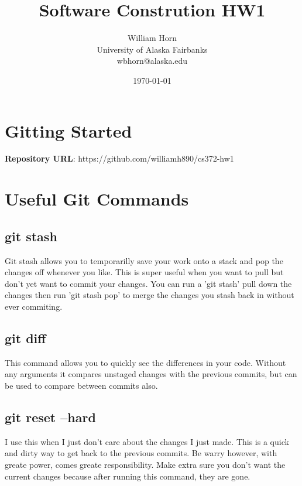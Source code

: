 \documentclass{article}
\begin{document}
\title{Software Constrution HW1}
\author{William Horn\\University of Alaska Fairbanks\\wbhorn@alaska.edu}
\date{\today}
\maketitle
\section{Gitting Started}
\textbf{Repository URL}: https://github.com/williamh890/cs372-hw1 \\
\section{Useful Git Commands}
\subsection{git stash}
Git stash allows you to temporarilly save your work onto a stack and pop the changes off whenever you like.
This is super useful when you want to pull but don't yet want to commit your changes. You can run a 'git stash' pull
down the changes then run 'git stash pop' to merge the changes you stash back in without ever commiting.
\subsection{git diff}
This command allows you to quickly see the differences in your code. Without any arguments it compares unstaged changes
with the previous commits, but can be used to compare between commits also.
\subsection{git reset --hard}
I use this when I just don't care about the changes I just made. This is a quick and dirty way to
get back to the previous commits. Be warry however, with greate power, comes greate responsibility.
Make extra sure you don't want the current changes because after running this command, they are gone.
\end{document}
